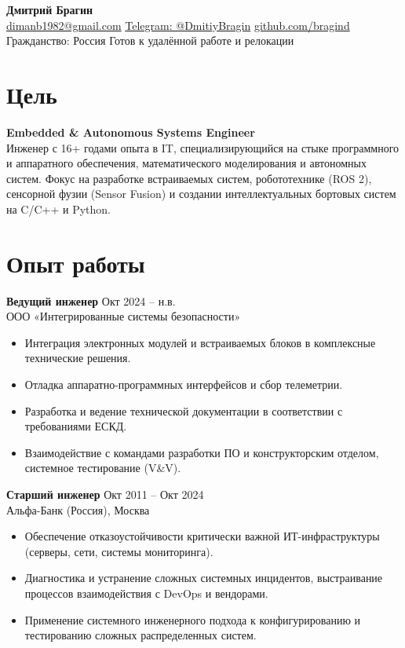 \documentclass[10pt,a4paper]{article}
\begin{document}
\begin{center}
    {\LARGE \textbf{Дмитрий Брагин}} \\[4pt]
    \small
    \href{mailto:dimanb1982@gmail.com}{dimanb1982@gmail.com} \textbar{} 
    \href{https://t.me/DmitiyBragin}{Telegram: @DmitiyBragin} \textbar{} 
    \href{https://github.com/bragind}{github.com/bragind} \\
    Гражданство: Россия \textbar{} Готов к удалённой работе и релокации
\end{center}

\vspace{8pt}

\section*{Цель}
\textbf{Embedded \& Autonomous Systems Engineer} \\
Инженер с 16+ годами опыта в IT, специализирующийся на стыке программного и аппаратного обеспечения, математического моделирования и автономных систем. Фокус на разработке встраиваемых систем, робототехнике (ROS 2), сенсорной фузии (Sensor Fusion) и создании интеллектуальных бортовых систем на C/C++ и Python.

\section*{Опыт работы}
\textbf{Ведущий инженер} \hfill Окт 2024 -- н.в. \\
ООО «Интегрированные системы безопасности»
\begin{itemize}
    \item Интеграция электронных модулей и встраиваемых блоков в комплексные технические решения.
    \item Отладка аппаратно-программных интерфейсов и сбор телеметрии.
    \item Разработка и ведение технической документации в соответствии с требованиями ЕСКД.
    \item Взаимодействие с командами разработки ПО и конструкторским отделом, системное тестирование (V\&V).
\end{itemize}

\textbf{Старший инженер} \hfill Окт 2011 -- Окт 2024 \\
Альфа-Банк (Россия), Москва
\begin{itemize}
    \item Обеспечение отказоустойчивости критически важной ИТ-инфраструктуры (серверы, сети, системы мониторинга).
    \item Диагностика и устранение сложных системных инцидентов, выстраивание процессов взаимодействия с DevOps и вендорами.
    \item Применение системного инженерного подхода к конфигурированию и тестированию сложных распределенных систем.
\end{itemize}
\end{document}
